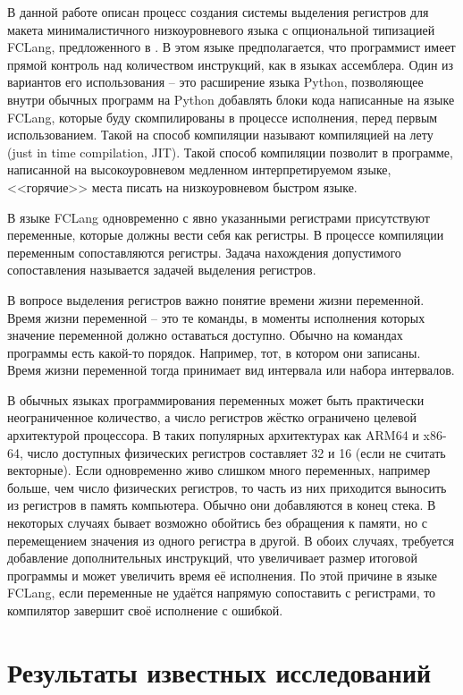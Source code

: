 \documentclass[a4paper,14pt]{extarticle}
\begin{document}
В данной работе описан процесс создания системы выделения регистров для
макета минималистичного низкоуровневого языка с опциональной типизацией FCLang, предложенного в \cite{____2023}.
В этом языке предполагается, что программист имеет прямой контроль над количеством инструкций, как в языках ассемблера.
Один из вариантов его использования -- это расширение языка Python, позволяющее внутри обычных программ на Python 
добавлять блоки кода написанные на языке FCLang, которые буду скомпилированы в процессе исполнения, перед первым использованием.
Такой на способ компиляции называют компиляцией на лету (just in time compilation, JIT).
Такой способ компиляции позволит в программе, написанной на высокоуровневом медленном интерпретируемом языке, <<горячие>> места писать на низкоуровневом быстром языке.

В языке FCLang одновременно с явно указанными регистрами присутствуют переменные, которые должны вести себя как регистры.
В процессе компиляции переменным сопоставляются регистры.
Задача нахождения допустимого сопоставления называется задачей выделения регистров.

В вопросе выделения регистров важно понятие времени жизни переменной.
Время жизни переменной -- это те команды, в моменты исполнения которых значение переменной должно оставаться доступно.
Обычно на командах программы есть какой-то порядок.
Например, тот, в котором они записаны.
Время жизни переменной тогда принимает вид интервала или набора интервалов.

В обычных языках программирования переменных может быть практически неограниченное количество, а число регистров жёстко ограничено целевой архитектурой процессора.
В таких популярных архитектурах как ARM64 и x86-64, число доступных физических регистров составляет 32 и 16 (если не считать векторные).
Если одновременно живо слишком много переменных, например больше, чем число физических регистров,
то часть из них приходится выносить из регистров в память компьютера.
Обычно они добавляются в конец стека.
В некоторых случаях бывает возможно обойтись без обращения к памяти, но с перемещением значения из одного регистра в другой.
В обоих случаях, требуется добавление дополнительных инструкций, что увеличивает размер итоговой программы и может увеличить время её исполнения.
По этой причине в языке FCLang, если переменные не удаётся напрямую сопоставить с регистрами, то компилятор завершит своё исполнение с ошибкой.

\section{Результаты известных исследований}
\end{document}
